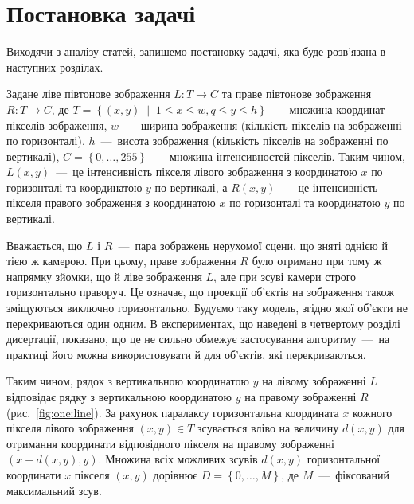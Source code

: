 \section{Постановка задачі}

Виходячи з аналізу статей, запишемо постановку задачі,
яка буде розв'язана в наступних розділах.

Задане ліве півтонове зображення $L : T \to C$
та праве півтонове зображення $R : T \to C$,
де
$T = \left\{
    \left( x, y \right) \; \middle| \; 1 \le x \le w, q \le y \le h
\right\}$~---~множина координат пікселів зображення,
$w$~---~ширина зображення (кількість пікселів на зображенні по горизонталі),
$h$~---~висота зображення (кількість пікселів на зображенні по вертикалі),
$C = \left\{ 0, \dotsc, 255 \right\} $~---~множина інтенсивностей пікселів.
Таким чином,
$L \left(x, y \right)$~---~це інтенсивність пікселя лівого зображення
з координатою $x$ по горизонталі та координатою $y$ по вертикалі,
а $R \left( x, y \right)$~---~це інтенсивність пікселя правого зображення
з координатою $x$ по горизонталі та координатою $y$ по вертикалі.

Вважається, що $L$ і $R$~---~пара зображень нерухомої сцени,
що зняті однією й тією ж камерою.
При цьому, праве зображення $R$ було отримано при тому ж напрямку зйомки,
що й ліве зображення $L$, але при зсуві камери строго горизонтально праворуч.
Це означає,
що проекції об'єктів на зображення також зміщуються виключно горизонтально.
Будуємо таку модель, згідно якої об'єкти не перекриваються один одним.
В експериментах, що наведені в четвертому розділі дисертації, показано,
що це не сильно обмежує застосування алгоритму~---~на практиці його можна
використовувати й для об'єктів, які перекриваються.

Таким чином, рядок з вертикальною координатою $y$
на лівому зображенні $L$ відповідає
рядку з вертикальною координатою $y$ на правому зображенні $R$
(рис.~\ref{fig:one:line}).
За рахунок паралаксу горизонтальна координата $x$
кожного пікселя лівого зображення $\left( x, y \right) \in T$
зсувається вліво на величину $d \left(x, y \right) $
для отримання координати відповідного пікселя на правому зображенні
$\left( x - d \left(x, y \right), y \right)$.
Множина всіх можливих зсувів $d \left(x, y \right)$
горизонтальної координати $x$ пікселя $\left(x, y \right)$ дорівнює
$D = \left\{ 0, \dotsc, M \right\}$, де $M$~---~фіксований максимальний зсув.

